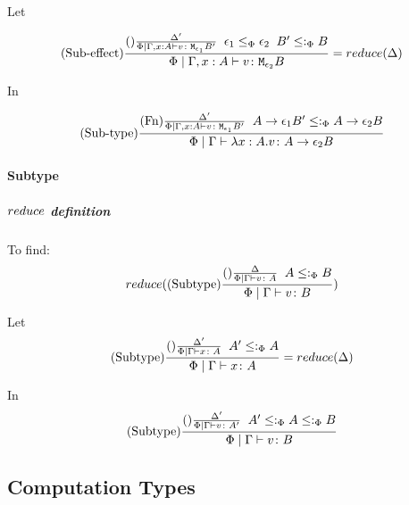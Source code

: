 \documentclass{report}
\begin{document}
            Let 

            \begin{equation}
                (\text{Sub-effect}) \frac{
                    (\text{}) \frac{\Delta'}{\Phi\mid\Gamma, x: A \vdash v \colon \texttt{M}_{\epsilon_1}{B'}}
                    \;\;
                    \epsilon_1\leq_{\Phi}\epsilon_2
                    \;\;
                    B' \leq:_\Phi B
                }{
                    \Phi\mid\Gamma, x: A \vdash v \colon \texttt{M}_{\epsilon_2}{B}
                } = reduce(\Delta)
            \end{equation}

            In

            \begin{equation}
                (\text{Sub-type}) \frac{
                    (\text{Fn}) \frac{
                        \Delta'
                    }{
                        \Phi\mid\Gamma, x: A \vdash v \colon \texttt{M}_{\epsilon_1}{B'}
                    }
                    \;\;
                    A\rightarrow \epsilon_1{B'}\leq:_\Phi A\rightarrow \epsilon_2{B}
                }{
                    \Phi\mid\Gamma \vdash \lambda x : A. v \colon A\rightarrow \epsilon_2{B}
                }
            \end{equation}

        \paragraph{Subtype}
        \subparagraph{$reduce$ definition}
        To find:
        \begin{equation}
            reduce((\text{Subtype}) \frac{(\text{}) \frac{\Delta}{\Phi\mid\Gamma \vdash v \colon A}\;\; A \leq:_\Phi B}{\Phi\mid\Gamma \vdash v \colon B})
        \end{equation}

        Let 
        \begin{equation}\label{SubtypeDeltaReduction}
            (\text{Subtype}) \frac{(\text{}) \frac{\Delta'}{\Phi\mid\Gamma \vdash x \colon A}\;\; A'\leq:_\Phi A}{\Phi\mid\Gamma \vdash x \colon A} = reduce(\Delta)
        \end{equation}

        In 
        \begin{equation}
            (\text{Subtype}) \frac{
                (\text{}) \frac{\Delta'}{\Phi\mid\Gamma \vdash v \colon A'}
            \;\;
            A' \leq:_\Phi A \leq:_\Phi B
            }{\Phi\mid\Gamma \vdash v \colon B}
        \end{equation}

    \subsection{Computation Types}
\end{document}
